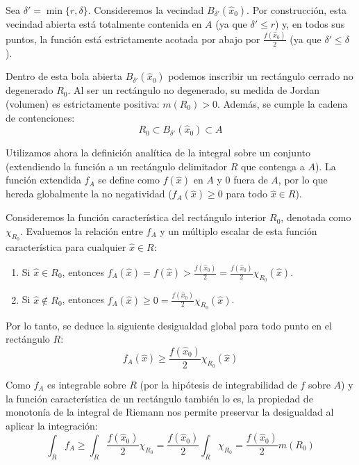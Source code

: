 \documentclass[11pt,letterpaper]{article}
\begin{document}
Sea $\delta' = \min\{r, \delta\}$. Consideremos la vecindad $B_{\delta'}(\hat{x}_0)$. Por construcción, esta vecindad abierta está totalmente contenida en $A$ (ya que $\delta' \le r$) y, en todos sus puntos, la función está estrictamente acotada por abajo por $\frac{f(\hat{x}_0)}{2}$ (ya que $\delta' \le \delta$).
    
Dentro de esta bola abierta $B_{\delta'}(\hat{x}_0)$ podemos inscribir un rectángulo cerrado no degenerado $R_0$. Al ser un rectángulo no degenerado, su medida de Jordan (volumen) es estrictamente positiva: $m(R_0) > 0$. Además, se cumple la cadena de contenciones:
\begin{equation*}
R_0 \subset B_{\delta'}(\hat{x}_0) \subset A
\end{equation*}

Utilizamos ahora la definición analítica de la integral sobre un conjunto (extendiendo la función a un rectángulo delimitador $R$ que contenga a $A$). La función extendida $f_A$ se define como $f(\hat{x})$ en $A$ y $0$ fuera de $A$, por lo que hereda globalmente la no negatividad ($f_A(\hat{x}) \ge 0$ para todo $\hat{x} \in R$).

Consideremos la función característica del rectángulo interior $R_0$, denotada como $\chi_{R_0}$. Evaluemos la relación entre $f_A$ y un múltiplo escalar de esta función característica para cualquier $\hat{x} \in R$:
\begin{enumerate}
    \item Si $\hat{x} \in R_0$, entonces $f_A(\hat{x}) = f(\hat{x}) > \frac{f(\hat{x}_0)}{2} = \frac{f(\hat{x}_0)}{2} \chi_{R_0}(\hat{x})$.
    \item Si $\hat{x} \notin R_0$, entonces $f_A(\hat{x}) \ge 0 = \frac{f(\hat{x}_0)}{2} \chi_{R_0}(\hat{x})$.
\end{enumerate}

Por lo tanto, se deduce la siguiente desigualdad global para todo punto en el rectángulo $R$:
\begin{equation*}
f_A(\hat{x}) \ge \frac{f(\hat{x}_0)}{2} \chi_{R_0}(\hat{x})
\end{equation*}

Como $f_A$ es integrable sobre $R$ (por la hipótesis de integrabilidad de $f$ sobre $A$) y la función característica de un rectángulo también lo es, la propiedad de monotonía de la integral de Riemann nos permite preservar la desigualdad al aplicar la integración:
\begin{equation*}
\int_R f_A \ge \int_R \frac{f(\hat{x}_0)}{2} \chi_{R_0} = \frac{f(\hat{x}_0)}{2} \int_R \chi_{R_0} = \frac{f(\hat{x}_0)}{2} m(R_0)
\end{equation*}
\end{document}
